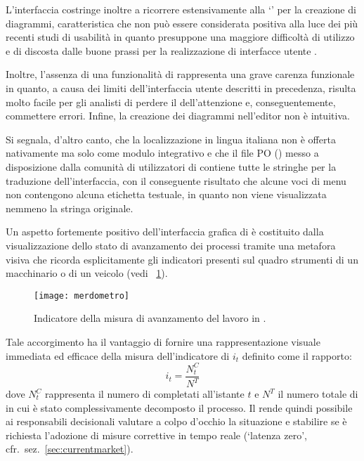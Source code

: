 L'interfaccia  costringe inoltre a ricorrere estensivamente alla  `' per la creazione di diagrammi, caratteristica che non può essere considerata positiva alla luce dei più recenti studi di usabilità in quanto presuppone una maggiore difficoltà di utilizzo e di discosta dalle buone prassi per la realizzazione di interfacce utente \cite{nielsen:mistakes}.

Inoltre, l'assenza di una funzionalità di  rappresenta una grave carenza funzionale in quanto, a causa dei limiti dell'interfaccia utente descritti in precedenza, risulta molto facile per gli analisti di \bsn perdere il  dell'attenzione e, conseguentemente, commettere errori. Infine, la creazione dei diagrammi nell'editor non è intuitiva.

Si segnala, d'altro canto, che la localizzazione in lingua italiana non è offerta nativamente ma solo come modulo integrativo e che il file PO () messo a disposizione dalla comunità di utilizzatori di \progname contiene tutte le stringhe per la traduzione dell'interfaccia, con il conseguente risultato che alcune voci di menu non contengono alcuna etichetta testuale, in quanto non viene visualizzata nemmeno la stringa originale.

Un aspetto fortemente positivo dell'interfaccia grafica di \progname è costituito dalla visualizzazione dello stato di avanzamento dei processi tramite una metafora visiva che ricorda esplicitamente gli indicatori presenti sul quadro strumenti di un macchinario o di un veicolo (vedi \figurename~\ref{fig:merdometro}).

\begin{figure}[H]
  \centering
  \texttt{[image: merdometro]}
  \caption{Indicatore della misura di avanzamento del lavoro in \progname.}
  \label{fig:merdometro}
\end{figure}

Tale accorgimento ha il vantaggio di fornire una rappresentazione visuale immediata ed efficace della misura dell'indicatore di  $i_{t}$ definito come il rapporto:
\[
i_{t} = \frac{N^{C}_{t}}{N^{T}}
\]
dove $N^{C}_{t}$ rappresenta il numero di  completati all'istante $t$ e $N^{T}$ il numero totale di  in cui è stato complessivamente decomposto il processo. Il \sw rende quindi possibile ai responsabili decisionali valutare a colpo d'occhio la situazione e stabilire se è richiesta l'adozione di misure correttive in tempo reale (`latenza zero', cfr.~sez.~\ref{sec:currentmarket}).

